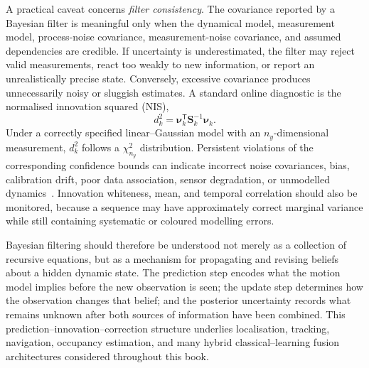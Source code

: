 
A practical caveat concerns \emph{filter consistency}. The covariance
reported by a Bayesian filter is meaningful only when the dynamical
model, measurement model, process-noise covariance, measurement-noise
covariance, and assumed dependencies are credible. If uncertainty is
underestimated, the filter may reject valid measurements, react too
weakly to new information, or report an unrealistically precise state.
Conversely, excessive covariance produces unnecessarily noisy or
sluggish estimates. A standard online diagnostic is the normalised
innovation squared (NIS),
\begin{equation}
d^2_k
=
\boldsymbol{\nu}_k^{\mathsf T}
\mathbf{S}_k^{-1}
\boldsymbol{\nu}_k.
\label{eq:nis}
\end{equation}
Under a correctly specified linear--Gaussian model with an
$n_y$-dimensional measurement, $d^2_k$ follows a
$\chi^2_{n_y}$ distribution. Persistent violations of the corresponding
confidence bounds can indicate incorrect noise covariances, bias,
calibration drift, poor data association, sensor degradation, or
unmodelled dynamics~\cite{barshalom2001_estimation}. Innovation
whiteness, mean, and temporal correlation should also be monitored,
because a sequence may have approximately correct marginal variance
while still containing systematic or coloured modelling errors.

Bayesian filtering should therefore be understood not merely as a collection of recursive equations, but as a mechanism for propagating and revising beliefs about a hidden dynamic state. The prediction step encodes what the motion model implies before the new observation is seen; the update step determines how the observation changes that belief; and the posterior uncertainty records what remains unknown after both sources of information have been combined. This prediction--innovation--correction structure underlies localisation, tracking, navigation, occupancy estimation, and many hybrid classical--learning fusion architectures considered throughout this book.

